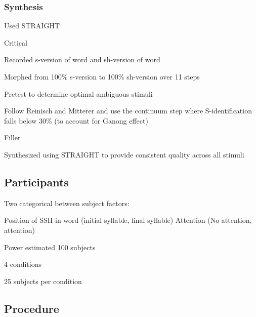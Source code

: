\subsubsection{Synthesis}

Used STRAIGHT

Critical

	Recorded s-version of word and sh-version of word

	Morphed from 100\% s-version to 100\% sh-version over 11 steps

	Pretest to determine optimal ambiguous stimuli

	Follow Reinisch and Mitterer and use the continuum step where S-identification falls below 30\% (to account for Ganong effect)

Filler

	Synthesized using STRAIGHT to provide consistent quality across all stimuli


\subsection{Participants}

Two categorical between subject factors:

	Position of SSH in word (initial syllable, final syllable)
	Attention (No attention, attention)

Power estimated 100 subjects

4 conditions

25 subjects per condition

\subsection{Procedure}



